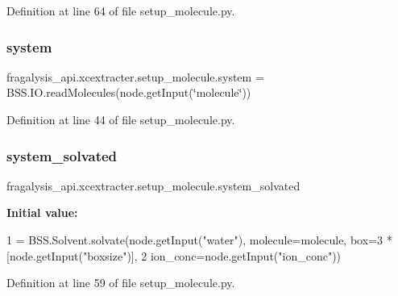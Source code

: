 Definition at line 64 of file setup\+\_\+molecule.\+py.

\mbox{\label{namespacefragalysis__api_1_1xcextracter_1_1setup__molecule_acab61f5fcadc9988846e8ca1dab4024e}} 
\subsubsection{\texorpdfstring{system}{system}}
{\footnotesize\ttfamily fragalysis\+\_\+api.\+xcextracter.\+setup\+\_\+molecule.\+system = B\+S\+S.\+I\+O.\+read\+Molecules(node.\+get\+Input(\char`\"{}molecule\char`\"{}))}



Definition at line 44 of file setup\+\_\+molecule.\+py.

\mbox{\label{namespacefragalysis__api_1_1xcextracter_1_1setup__molecule_a3eab3585c91264e66a041fdb0932fd48}} 
\subsubsection{\texorpdfstring{system\+\_\+solvated}{system\_solvated}}
{\footnotesize\ttfamily fragalysis\+\_\+api.\+xcextracter.\+setup\+\_\+molecule.\+system\+\_\+solvated}

{\bfseries Initial value\+:}
\begin{DoxyCode}
1 =  BSS.Solvent.solvate(node.getInput(\textcolor{stringliteral}{"water"}), molecule=molecule, box=3 * [node.getInput(\textcolor{stringliteral}{"boxsize"})],
2                                       ion\_conc=node.getInput(\textcolor{stringliteral}{"ion\_conc"}))
\end{DoxyCode}


Definition at line 59 of file setup\+\_\+molecule.\+py.

